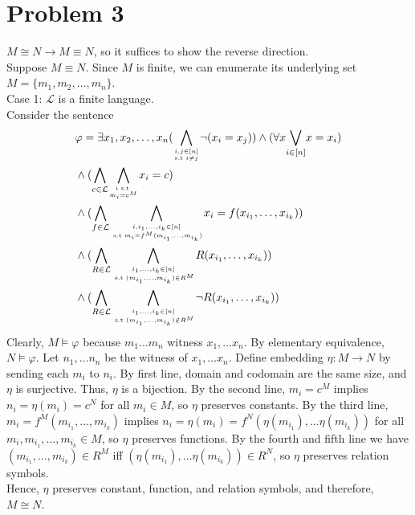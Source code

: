 \documentclass[10pt]{article}
\begin{document}
\section*{Problem 3}
$M\cong N\rightarrow M\equiv N$, so it suffices to show the reverse direction.\\
Suppose $M\equiv N$. Since $M$ is finite, we can enumerate its underlying set $M=\{m_1,m_2,\ldots, m_n\}$.\\
Case 1: $\mathcal{L}$ is a finite language.\\
Consider the sentence
\begin{align*}
  & \varphi=\exists x_1,x_2,\ldots,x_n(\underset{i,j\in[n]\atop\text{s.t }i\neq j}{\bigwedge}\lnot(x_i=x_j))\land(\forall x\underset{i\in[n]}{\bigvee}x=x_i)\\
  & \land (\underset{c\in\mathcal{L}}{\bigwedge}\underset{i\text{ s.t }\atop m_i=c^M}{\bigwedge}x_i=c)\\
  & \land (\underset{f\in\mathcal{L}}{\bigwedge}\underset{i,i_1,\ldots,i_k\in[n]\atop\text{ s.t }m_i=f^M(m_{i_1},\ldots,m_{i_k})}{\bigwedge}x_i=f(x_{i_1},\ldots,x_{i_k}))\\
  & \land (\underset{R\in\mathcal{L}}{\bigwedge}\underset{i_1,\ldots,i_k\in[n]\atop\text{ s.t }(m_{i_1},\ldots,m_{i_k})\in R^M}{\bigwedge}R(x_{i_1},\ldots,x_{i_k}))\\
  & \land (\underset{R\in\mathcal{L}}{\bigwedge}\underset{i_1,\ldots,i_k\in[n]\atop\text{ s.t }(m_{i_1},\ldots,m_{i_k})\notin R^M}{\bigwedge}\lnot R(x_{i_1},\ldots,x_{i_k}))
\end{align*}
Clearly, $M\models \varphi$ because $m_1\ldots m_n$ witness $x_1,\ldots x_n$. By elementary equivalence, $N\models \varphi$. Let $n_1,\ldots n_n$ be the witness of $x_1,\ldots x_n$.
Define embedding $\eta: M\rightarrow N$ by sending each $m_i$ to $n_i$.
By first line, domain and codomain are the same size, and $\eta$ is surjective. Thus, $\eta$ is a bijection. 
By the second line, $m_i=c^M$ implies $n_i=\eta(m_i)=c^N$ for all $m_i\in M$, so $\eta$ preserves constants.
By the third line, $m_i=f^M(m_{i_1},\ldots,m_{i_k})$ implies $n_i=\eta(m_i)=f^N(\eta(m_{i_1}),\ldots\eta(m_{i_k}))$ for all $m_i,m_{i_1},\ldots,m_{i_k}\in M$, so $\eta$ preserves functions.
By the fourth and fifth line we have $(m_{i_1},\ldots,m_{i_k})\in R^M$ iff $(\eta(m_{i_1}),\ldots\eta(m_{i_k}))\in R^N$, so $\eta$ preserves relation symbols.\\
Hence, $\eta$ preserves constant, function, and relation symbols, and therefore, $M\cong N$.
\end{document}
